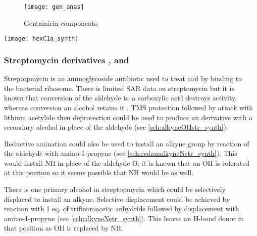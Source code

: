 \begin{figure}[H]
	\begin{center}
		\texttt{[image: gen\_anas]}
		\caption{Gentamicin components. \label{fgr:gen_anas}} 
	\end{center}
\end{figure}

\begin{scheme}[H]
	\begin{center}
		\texttt{[image: hexC1a\_synth]}
		\caption{Proposed synthesis of gentamicin C1a derivative . a) DIPEA, DMF, - 55 $^{\circ}$C. \label{sch:hexC1a_synth}}
	\end{center}
\end{scheme}

\subsubsection{Streptomycin derivatives ,  and }

Streptopmycin  is an aminoglycoside antibiotic used to treat  and  by binding to the bacterial ribosome. There is limited SAR data on streptomycin but it is known that conversion of the aldehyde to a carboxylic acid destroys activity, whereas conversion an alcohol retains it \cite{lemke2012foye}. TMS protection followed by attack with lithium acetylide then deprotection could be used to produce an derivative  with a secondary alcohol in place of the aldehyde (see \ref{sch:alkyneOHstr_synth}).

Reductive amination could also be used to install an alkyne group by reaction of the aldehyde with amino-1-propyne (see \ref{sch:redamalkyneNstr_synth})\cite{Abdel-Magid1996}. This would install NH in place of the aldehyde O; it is known that an OH is tolerated at this position so it seems possible that NH would be as well.

There is one primary alcohol in streptopmycin  which could be selectively displaced to install an alkyne. Selective displacement could be achieved by reaction with 1 eq. of trifluoroacetic anhydride followed by displacement with amino-1-propyne (see \ref{sch:alkyneNstr_synth})\cite{Coimbra2010}. This leaves an H-bond donor in that position as OH is replaced by NH.


